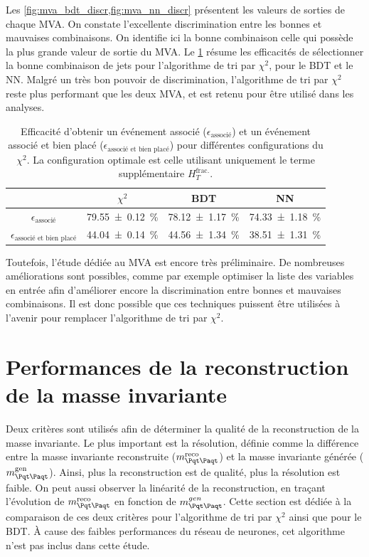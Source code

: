 Les \cref{fig:mva_bdt_discr,fig:mva_nn_discr} présentent les valeurs de sorties de chaque MVA. On constate l'excellente discrimination entre les bonnes et mauvaises combinaisons. On identifie ici la bonne combinaison celle qui possède la plus grande valeur de sortie du MVA. Le \cref{tab:chi2_vs_bdt_vs_nn} résume les efficacités de sélectionner la bonne combinaison de jets pour l'algorithme de tri par $\chi^2$, pour le BDT et le NN. Malgré un très bon pouvoir de discrimination, l'algorithme de tri par $\chi^2$ reste plus performant que les deux MVA, et est retenu pour être utilisé dans les analyses.

\begin{table}[tbp] \centering
    \begin{tabular}{@{}cccc@{}} \toprule
        & $\chi^2$ & BDT & NN \\ \midrule
        $\epsilon_\text{associé}$ & \SI{79.55 \pm 0.12}{\%} & \SI{78.12 \pm 1.17}{\%} & \SI{74.33 \pm 1.18}{\%} \\
        $\epsilon_\text{associé et bien placé}$ & \SI{44.04 \pm 0.14}{\%} & \SI{44.56 \pm 1.34}{\%} & \SI{38.51 \pm 1.31}{\%} \\ \bottomrule
    \end{tabular}
    \caption{Efficacité d'obtenir un événement associé ($\epsilon_\text{associé}$) et un événement associé et bien placé ($\epsilon_\text{associé et bien placé}$) pour différentes configurations du $\chi^2$. La configuration optimale est celle utilisant uniquement le terme supplémentaire $H_{T}^{\text{frac.}}$.}
    \label{tab:chi2_vs_bdt_vs_nn}
\end{table}



\bigskip

Toutefois, l'étude dédiée au MVA est encore très préliminaire. De nombreuses améliorations sont possibles, comme par exemple optimiser la liste des variables en entrée afin d'améliorer encore la discrimination entre bonnes et mauvaises combinaisons. Il est donc possible que ces techniques puissent être utilisées à l'avenir pour remplacer l'algorithme de tri par $\chi^2$.

\section{Performances de la reconstruction de la masse invariante} \label{sec:perf_reco_tt}

Deux critères sont utilisés afin de déterminer la qualité de la reconstruction de la masse invariante. Le plus important est la résolution, définie comme la différence entre la masse invariante reconstruite ($\mtt^\text{reco}$) et la masse invariante générée ($\mtt^\text{gen}$). Ainsi, plus la reconstruction est de qualité, plus la résolution est faible. On peut aussi observer la linéarité de la reconstruction, en traçant l'évolution de $\mtt^\text{reco}$ en fonction de $\mtt^{gen}$. Cette section est dédiée à la comparaison de ces deux critères pour l'algorithme de tri par $\chi^2$ ainsi que pour le BDT. À cause des faibles performances du réseau de neurones, cet algorithme n'est pas inclus dans cette étude.

